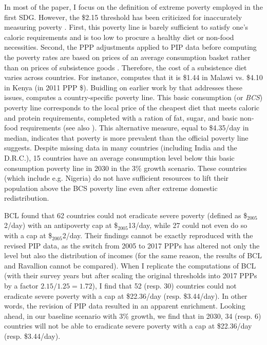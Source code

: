 In most of the paper, I focus on the definition of extreme poverty employed in the first SDG. However, the \$2.15 threshold has been criticized for inaccurately measuring poverty \citep{woodward_redefining_2010,deaton_price_2010,deaton_purchasing_2011}. %
First, this poverty line %
is barely sufficient to satisfy one's caloric requirements and is too low to procure a healthy diet or non-food necessities. 
Second, the PPP adjustments applied to PIP data before computing the poverty rates are based on prices of an average consumption basket rather than on prices of subsistence goods \citep{sullivan_capitalist_2023}. Therefore, the cost of a subsistence diet varies across countries. For instance, \cite{moatsos_global_2016} computes that it is \$1.44 in Malawi vs. \$4.10 in Kenya (in 2011 PPP \$). Buidling on earlier work by \cite{allen_absolute_2017} that addresses these issues, \cite{moatsos_global_2016} computes a country-specific poverty line. This basic consumption (or \textit{BCS}) poverty line corresponds to the local price of the cheapest diet that meets caloric and protein requirements, completed with a ration of fat, sugar, and basic non-food requirements (see also \citealp{moatsos_global_2021}). This alternative measure, equal to \$4.35/day in median, indicates that poverty %
is more prevalent than the official poverty line suggests. Despite missing data in many countries (including India and the D.R.C.), 15 countries have an average consumption level below this basic consumption poverty line in 2030 in the 3\% growth scenario. These countries (which include e.g. Nigeria) do not have sufficient resources to lift their population above the BCS poverty line even after extreme domestic redistribution. 

BCL found that 62 countries could not eradicate severe poverty (defined as \$$_\text{2005}$2/day) with an antipoverty cap at \$$_\text{2005}$13/day, while 27 could not even do so with a cap at \$$_\text{2005}$2/day. 
Their findings cannot be exactly reproduced with the revised PIP data, as the switch from 2005 to 2017 PPPs has altered not only the level but also the distribution of incomes (for the same reason, the results of BCL and Ravallion cannot be compared). 
When I replicate the computations of BCL (with their survey years but after scaling the original thresholds into 2017 PPPs by a factor $2.15/1.25 = 1.72$), I find that 52 (resp. 30) 
countries could not eradicate severe poverty with a cap at \$22.36/day (resp. \$3.44/day). 
In other words, the revision of PIP data resulted in an apparent enrichment. 
Looking ahead, in our baseline scenario with 3\% growth, we find that in 2030, 34 (resp. 6) 
countries will not be able to eradicate severe poverty with a cap at \$22.36/day (resp. \$3.44/day).

